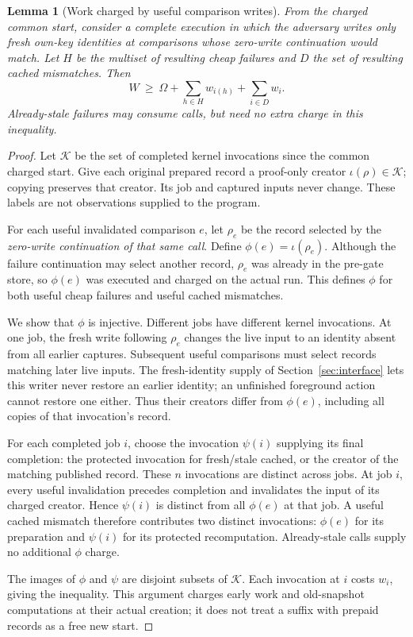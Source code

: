 \documentclass[acmsmall,screen,review,anonymous]{acmart}
\newtheorem{lemma}{Lemma}
\begin{document}
\begin{lemma}[Work charged by useful comparison writes]
\label{lem:charging}
From the charged common start, consider a complete execution in which the adversary writes only fresh own-key identities at comparisons whose zero-write continuation would match. Let $H$ be the multiset of resulting cheap failures and $D$ the set of resulting cached mismatches. Then
\[
 W\ \ge\ \Omega+\sum_{h\in H}w_{i(h)}+\sum_{i\in D}w_i.
\]
Already-stale failures may consume calls, but need no extra charge in this inequality.
\end{lemma}
\begin{proof}
Let $\mathcal K$ be the set of completed kernel invocations since the common charged start. Give each original prepared record a proof-only creator $\iota(\rho)\in\mathcal K$; copying preserves that creator. Its job and captured inputs never change. These labels are not observations supplied to the program.

For each useful invalidated comparison $e$, let $\rho_e$ be the record selected by the \emph{zero-write continuation of that same call}. Define $\phi(e)=\iota(\rho_e)$. Although the failure continuation may select another record, $\rho_e$ was already in the pre-gate store, so $\phi(e)$ was executed and charged on the actual run. This defines $\phi$ for both useful cheap failures and useful cached mismatches.

We show that $\phi$ is injective. Different jobs have different kernel invocations. At one job, the fresh write following $\rho_e$ changes the live input to an identity absent from all earlier captures. Subsequent useful comparisons must select records matching later live inputs. The fresh-identity supply of Section~\ref{sec:interface} lets this writer never restore an earlier identity; an unfinished foreground action cannot restore one either. Thus their creators differ from $\phi(e)$, including all copies of that invocation's record.

For each completed job $i$, choose the invocation $\psi(i)$ supplying its final completion: the protected invocation for fresh/stale cached, or the creator of the matching published record. These $n$ invocations are distinct across jobs. At job $i$, every useful invalidation precedes completion and invalidates the input of its charged creator. Hence $\psi(i)$ is distinct from all $\phi(e)$ at that job. A useful cached mismatch therefore contributes two distinct invocations: $\phi(e)$ for its preparation and $\psi(i)$ for its protected recomputation. Already-stale calls supply no additional $\phi$ charge.

The images of $\phi$ and $\psi$ are disjoint subsets of $\mathcal K$. Each invocation at $i$ costs $w_i$, giving the inequality. This argument charges early work and old-snapshot computations at their actual creation; it does not treat a suffix with prepaid records as a free new start.

\end{proof}
\end{document}
